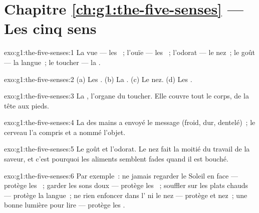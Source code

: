 \section*{Chapitre \ref{ch:g1:the-five-senses} --- Les cinq sens}

\begin{solution}{exo:g1:the-five-senses:1}
La vue --- les ~; l'ouïe --- les ~; l'odorat --- le
nez~; le goût --- la langue~; le toucher --- la .
\end{solution}

\begin{solution}{exo:g1:the-five-senses:2}
(a) Les . (b) La . (c) Le nez. (d) Les .
\end{solution}

\begin{solution}{exo:g1:the-five-senses:3}
La , l'organe du toucher. Elle couvre tout le corps, de la tête
aux pieds.
\end{solution}

\begin{solution}{exo:g1:the-five-senses:4}
La  des mains a envoyé le message (froid, dur, dentelé)~; le
cerveau l'a compris et a nommé l'objet.
\end{solution}

\begin{solution}{exo:g1:the-five-senses:5}
Le goût et l'odorat. Le nez fait la moitié du travail de la saveur,
et c'est pourquoi les aliments semblent fades quand il est bouché.
\end{solution}

\begin{solution}{exo:g1:the-five-senses:6}
Par exemple~: ne jamais regarder le Soleil en face --- protège les
~; garder les sons doux --- protège les ~; souffler sur
les plats chauds --- protège la langue~; ne rien enfoncer dans
l' ni le nez --- protège  et nez~; une bonne lumière
pour lire --- protège les .
\end{solution}

